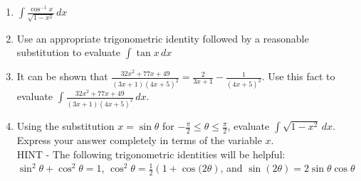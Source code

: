 \documentclass[12pt]{article}
\newif\ifans
\begin{document}
\begin{enumerate}
\ifans{\fbox{$\ln{|\ln{x}|}+C$}} \fi

\item $\int{\frac{\cos^{-1}{x}}{\sqrt{1-x^2}}} \,dx$

\ifans{\fbox{$-\frac{1}{2}\left(\cos^{-1}{x}\right)^2+C$}} \fi

\item Use an appropriate trigonometric identity followed by a reasonable substitution to evaluate $\int \tan{x} \,dx$

\ifans{\fbox{$\ln{|\sec{x}|}+C$}} \fi

\item It can be shown that $\frac{32x^2+77x+49}{(3x+1)(4x+5)^2}=\frac{2}{3x+1}-\frac{1}{(4x+5)^2}$.  Use this fact to evaluate $\int{\frac{32x^2+77x+49}{(3x+1)(4x+5)^2}} \,dx$.

\ifans{\fbox{$\frac{2}{3}\ln{|3x+1|}+\frac{1}{4(4x+5)}+C$}} \fi

\item Using the substitution $x=\sin{\theta}$ for $-\frac{\pi}{2} \leq \theta \leq \frac{\pi}{2}$, evaluate $\int{\sqrt{1-x^2}} \,dx$.  Express your answer completely in terms of the variable $x$.\\

HINT - The following trigonometric identities will be helpful:
$\sin^2{\theta}+\cos^2{\theta}=1$, $\cos^{2}{\theta}=\frac{1}{2}(1+\cos{(2\theta})$, and $\sin{(2\theta)}=2\sin{\theta}\cos{\theta}$\\

\ifans{\fbox{$\frac{1}{2}x\sqrt{1-x^2}+\frac{1}{2}\sin^{-1}{x}+C$}} \fi

\end{enumerate}
\end{document}

